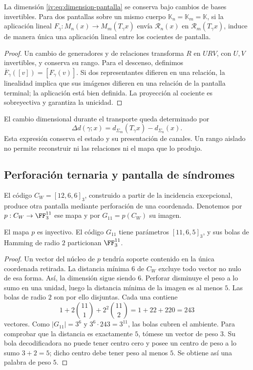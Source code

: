 \begin{proposition}
\label{iv:prop:pantalla-transporte}
La dimensión \eqref{iv:eq:dimension-pantalla} se conserva
bajo cambios de bases invertibles. Para dos pantallas sobre un mismo cuerpo
\(\mathbb K_n=\mathbb K_m=\mathbb K\), si la aplicación lineal
\(F_\gamma:M_n(x)\to M_m(T_\gamma x)\) envía
\(\mathcal R_n(x)\) en \(\mathcal R_m(T_\gamma x)\), induce
de manera única una aplicación lineal entre los cocientes de pantalla.
\end{proposition}
\begin{proof}
Un cambio de generadores y de relaciones transforma \(R\) en
\(URV\), con \(U,V\) invertibles, y conserva su rango. Para
el descenso, definimos
\(\overline F_\gamma([v])=[F_\gamma(v)]\). Si dos
representantes difieren en una relación, la linealidad implica que sus imágenes difieren
en una relación de la pantalla terminal; la aplicación está
bien definida. La proyección al cociente es sobreyectiva y
garantiza la unicidad.
\end{proof}

El cambio dimensional durante el transporte queda determinado
por
\[
 \Delta d(\gamma;x)=d_{\Sigma_m}(T_\gamma x)
                         -d_{\Sigma_n}(x).
\]
Esta expresión conserva el estado y su presentación de canales.
Un rango aislado no permite reconstruir ni las relaciones ni
el mapa que lo produjo.

\subsection{Perforación ternaria y pantalla de síndromes}

El código \(C_W=[12,6,6]_3\), construido a partir de la
incidencia excepcional, produce otra pantalla mediante
perforación de una coordenada. Denotemos por
\(p:C_W\to\FF_3^{11}\) ese mapa y por
\(G_{11}=p(C_W)\) su imagen.

\begin{proposition}
\label{iv:prop:codigo-once}
El mapa \(p\) es inyectivo. El código \(G_{11}\) tiene
parámetros \([11,6,5]_3\), y sus bolas de Hamming de radio
\(2\) particionan \(\FF_3^{11}\).
\end{proposition}
\begin{proof}
Un vector del núcleo de \(p\) tendría soporte contenido en
la única coordenada retirada. La distancia mínima \(6\)
de \(C_W\) excluye todo vector no nulo de esa forma.
Así, la dimensión sigue siendo \(6\). Perforar disminuye
el peso a lo sumo en una unidad, luego la distancia mínima
de la imagen es al menos \(5\). Las bolas de radio \(2\)
son por ello disjuntas. Cada una contiene
\[
 1+2\binom{11}{1}+2^2\binom{11}{2}
 =1+22+220=243
\]
vectores. Como \(|G_{11}|=3^6\) y
\(3^6\cdot243=3^{11}\), las bolas cubren el ambiente.
Para comprobar que la distancia es exactamente \(5\),
tómese un vector de peso \(3\). Su bola decodificadora
no puede tener centro cero y posee un centro de peso a lo
sumo \(3+2=5\); dicho centro debe tener peso al menos
\(5\). Se obtiene así una palabra de peso \(5\).
\end{proof}


